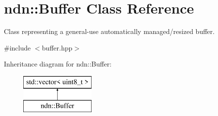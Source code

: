 \hypertarget{classndn_1_1Buffer}{}\section{ndn\+:\+:Buffer Class Reference}
\label{classndn_1_1Buffer}


Class representing a general-\/use automatically managed/resized buffer.  




{\ttfamily \#include $<$buffer.\+hpp$>$}

Inheritance diagram for ndn\+:\+:Buffer\+:\begin{figure}[H]
\begin{center}
\leavevmode
\includegraphics[height=2.000000cm]{classndn_1_1Buffer}
\end{center}
\end{figure}
